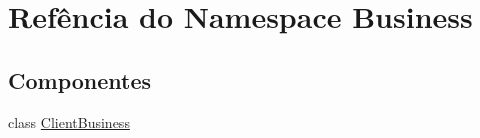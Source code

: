 \hypertarget{namespaceBusiness}{}\section{Refência do Namespace Business}
\label{namespaceBusiness}
\subsection*{Componentes}
\begin{DoxyCompactItemize}
\item 
class \hyperlink{classBusiness_1_1ClientBusiness}{Client\+Business}
\end{DoxyCompactItemize}
